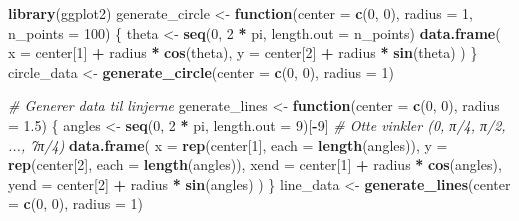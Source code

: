 \documentclass[
]{book}
\newenvironment{Shaded}{\begin{snugshade}}{\end{snugshade}}
\newcommand{\AttributeTok}[1]{\textcolor[rgb]{0.13,0.29,0.53}{#1}}
\newcommand{\CommentTok}[1]{\textcolor[rgb]{0.56,0.35,0.01}{\textit{#1}}}
\newcommand{\ControlFlowTok}[1]{\textcolor[rgb]{0.13,0.29,0.53}{\textbf{#1}}}
\newcommand{\DecValTok}[1]{\textcolor[rgb]{0.00,0.00,0.81}{#1}}
\newcommand{\FloatTok}[1]{\textcolor[rgb]{0.00,0.00,0.81}{#1}}
\newcommand{\FunctionTok}[1]{\textcolor[rgb]{0.13,0.29,0.53}{\textbf{#1}}}
\newcommand{\NormalTok}[1]{#1}
\newcommand{\OtherTok}[1]{\textcolor[rgb]{0.56,0.35,0.01}{#1}}
\newcommand{\SpecialCharTok}[1]{\textcolor[rgb]{0.81,0.36,0.00}{\textbf{#1}}}
\begin{document}
\begin{Shaded}
\begin{Highlighting}[]
\FunctionTok{library}\NormalTok{(ggplot2)}
\NormalTok{generate\_circle }\OtherTok{\textless{}{-}} \ControlFlowTok{function}\NormalTok{(}\AttributeTok{center =} \FunctionTok{c}\NormalTok{(}\DecValTok{0}\NormalTok{, }\DecValTok{0}\NormalTok{), }\AttributeTok{radius =} \DecValTok{1}\NormalTok{, }\AttributeTok{n\_points =} \DecValTok{100}\NormalTok{) \{}
\NormalTok{  theta }\OtherTok{\textless{}{-}} \FunctionTok{seq}\NormalTok{(}\DecValTok{0}\NormalTok{, }\DecValTok{2} \SpecialCharTok{*}\NormalTok{ pi, }\AttributeTok{length.out =}\NormalTok{ n\_points)}
  \FunctionTok{data.frame}\NormalTok{(}
    \AttributeTok{x =}\NormalTok{ center[}\DecValTok{1}\NormalTok{] }\SpecialCharTok{+}\NormalTok{ radius }\SpecialCharTok{*} \FunctionTok{cos}\NormalTok{(theta),}
    \AttributeTok{y =}\NormalTok{ center[}\DecValTok{2}\NormalTok{] }\SpecialCharTok{+}\NormalTok{ radius }\SpecialCharTok{*} \FunctionTok{sin}\NormalTok{(theta)}
\NormalTok{  )}
\NormalTok{\}}
\NormalTok{circle\_data }\OtherTok{\textless{}{-}} \FunctionTok{generate\_circle}\NormalTok{(}\AttributeTok{center =} \FunctionTok{c}\NormalTok{(}\DecValTok{0}\NormalTok{, }\DecValTok{0}\NormalTok{), }\AttributeTok{radius =} \DecValTok{1}\NormalTok{)}

\CommentTok{\# Generer data til linjerne}
\NormalTok{generate\_lines }\OtherTok{\textless{}{-}} \ControlFlowTok{function}\NormalTok{(}\AttributeTok{center =} \FunctionTok{c}\NormalTok{(}\DecValTok{0}\NormalTok{, }\DecValTok{0}\NormalTok{), }\AttributeTok{radius =} \FloatTok{1.5}\NormalTok{) \{}
\NormalTok{  angles }\OtherTok{\textless{}{-}} \FunctionTok{seq}\NormalTok{(}\DecValTok{0}\NormalTok{, }\DecValTok{2} \SpecialCharTok{*}\NormalTok{ pi, }\AttributeTok{length.out =} \DecValTok{9}\NormalTok{)[}\SpecialCharTok{{-}}\DecValTok{9}\NormalTok{] }\CommentTok{\# Otte vinkler (0, π/4, π/2, ..., 7π/4)}
  \FunctionTok{data.frame}\NormalTok{(}
    \AttributeTok{x =} \FunctionTok{rep}\NormalTok{(center[}\DecValTok{1}\NormalTok{], }\AttributeTok{each =} \FunctionTok{length}\NormalTok{(angles)),}
    \AttributeTok{y =} \FunctionTok{rep}\NormalTok{(center[}\DecValTok{2}\NormalTok{], }\AttributeTok{each =} \FunctionTok{length}\NormalTok{(angles)),}
    \AttributeTok{xend =}\NormalTok{ center[}\DecValTok{1}\NormalTok{] }\SpecialCharTok{+}\NormalTok{ radius }\SpecialCharTok{*} \FunctionTok{cos}\NormalTok{(angles),}
    \AttributeTok{yend =}\NormalTok{ center[}\DecValTok{2}\NormalTok{] }\SpecialCharTok{+}\NormalTok{ radius }\SpecialCharTok{*} \FunctionTok{sin}\NormalTok{(angles)}
\NormalTok{  )}
\NormalTok{\}}
\NormalTok{line\_data }\OtherTok{\textless{}{-}} \FunctionTok{generate\_lines}\NormalTok{(}\AttributeTok{center =} \FunctionTok{c}\NormalTok{(}\DecValTok{0}\NormalTok{, }\DecValTok{0}\NormalTok{), }\AttributeTok{radius =} \DecValTok{1}\NormalTok{)}



\end{Highlighting}
\end{Shaded}
\end{document}
